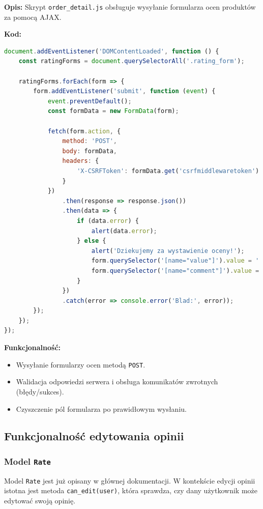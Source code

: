 \documentclass[12pt,a4paper,oneside]{article}
\theoremstyle{definition}
\numberwithin{equation}{section}
\begin{document}
\textbf{Opis:}  
Skrypt \texttt{order\_detail.js} obsługuje wysyłanie formularza ocen produktów za pomocą AJAX.

\textbf{Kod:}
\begin{lstlisting}[language=JavaScript]
document.addEventListener('DOMContentLoaded', function () {
    const ratingForms = document.querySelectorAll('.rating_form');

    ratingForms.forEach(form => {
        form.addEventListener('submit', function (event) {
            event.preventDefault();
            const formData = new FormData(form);

            fetch(form.action, {
                method: 'POST',
                body: formData,
                headers: {
                    'X-CSRFToken': formData.get('csrfmiddlewaretoken')
                }
            })
                .then(response => response.json())
                .then(data => {
                    if (data.error) {
                        alert(data.error);
                    } else {
                        alert('Dziekujemy za wystawienie oceny!');
                        form.querySelector('[name="value"]').value = '';
                        form.querySelector('[name="comment"]').value = '';
                    }
                })
                .catch(error => console.error('Blad:', error));
        });
    });
});
\end{lstlisting}

\textbf{Funkcjonalność:}
\begin{itemize}
    \item Wysyłanie formularzy ocen metodą \texttt{POST}.
    \item Walidacja odpowiedzi serwera i obsługa komunikatów zwrotnych (błędy/sukces).
    \item Czyszczenie pól formularza po prawidłowym wysłaniu.
\end{itemize}


\subsection{Funkcjonalność edytowania opinii}

\subsubsection{Model \texttt{Rate}}
Model \texttt{Rate} jest już opisany w głównej dokumentacji. W kontekście edycji opinii istotna jest metoda \texttt{can\_edit(user)}, która sprawdza, czy dany użytkownik może edytować swoją opinię.
\end{document}
